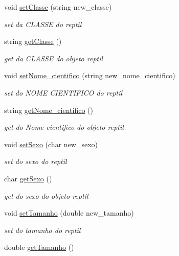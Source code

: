 \begin{DoxyCompactItemize}
void \mbox{\hyperlink{class_reptil_a978a77ecb44649c065c1932520499143}{set\+Classe}} (string new\+\_\+classe)
\begin{DoxyCompactList}\small\item\em set da C\+L\+A\+S\+SE do reptil \end{DoxyCompactList}\item 
string \mbox{\hyperlink{class_reptil_a9f247a06f325343bf147b5b93d3237fb}{get\+Classe}} ()
\begin{DoxyCompactList}\small\item\em get da C\+L\+A\+S\+SE do objeto reptil \end{DoxyCompactList}\item 
void \mbox{\hyperlink{class_reptil_afc4ae50f9acd8b35d0769e56fdc451ff}{set\+Nome\+\_\+cientifico}} (string new\+\_\+nome\+\_\+cientifico)
\begin{DoxyCompactList}\small\item\em set do N\+O\+ME C\+I\+E\+N\+T\+I\+F\+I\+CO do reptil \end{DoxyCompactList}\item 
string \mbox{\hyperlink{class_reptil_ae47155ed3aec72c48b1c8b2d9706e3cc}{get\+Nome\+\_\+cientifico}} ()
\begin{DoxyCompactList}\small\item\em get do Nome cientifico do objeto reptil \end{DoxyCompactList}\item 
void \mbox{\hyperlink{class_reptil_a91d7897209aea3a570cc56cd1e5384fc}{set\+Sexo}} (char new\+\_\+sexo)
\begin{DoxyCompactList}\small\item\em set do sexo do reptil \end{DoxyCompactList}\item 
char \mbox{\hyperlink{class_reptil_a60ecd7678f73c51cab6deededd12d957}{get\+Sexo}} ()
\begin{DoxyCompactList}\small\item\em get do sexo do objeto reptil \end{DoxyCompactList}\item 
void \mbox{\hyperlink{class_reptil_a3ce16647fa672d44d89f60e9d507b522}{set\+Tamanho}} (double new\+\_\+tamanho)
\begin{DoxyCompactList}\small\item\em set do tamanho do reptil \end{DoxyCompactList}\item 
double \mbox{\hyperlink{class_reptil_a545c6ffedb7c486a25ce5d318a2c9b4a}{get\+Tamanho}} ()

\end{DoxyCompactItemize}
